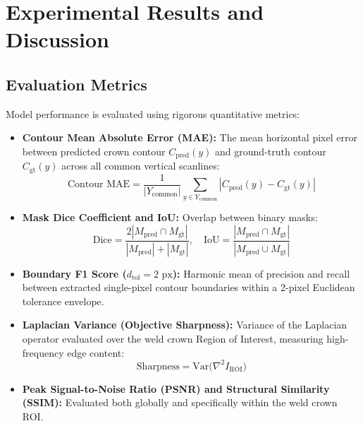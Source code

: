 \documentclass[12pt,a4paper,oneside]{report}
\begin{document}
\chapter{Experimental Results and Discussion}
\label{ch:results}

\section{Evaluation Metrics}
Model performance is evaluated using rigorous quantitative metrics:
\begin{itemize}
    \item \textbf{Contour Mean Absolute Error (MAE):} The mean horizontal pixel error between predicted crown contour $C_{\text{pred}}(y)$ and ground-truth contour $C_{\text{gt}}(y)$ across all common vertical scanlines:
    \begin{equation}
        \text{Contour MAE} = \frac{1}{|Y_{\text{common}}|} \sum_{y \in Y_{\text{common}}} |C_{\text{pred}}(y) - C_{\text{gt}}(y)|
    \end{equation}
    \item \textbf{Mask Dice Coefficient and IoU:} Overlap between binary masks:
    \begin{equation}
        \text{Dice} = \frac{2 |M_{\text{pred}} \cap M_{\text{gt}}|}{|M_{\text{pred}}| + |M_{\text{gt}}|}, \quad \text{IoU} = \frac{|M_{\text{pred}} \cap M_{\text{gt}}|}{|M_{\text{pred}} \cup M_{\text{gt}}|}
    \end{equation}
    \item \textbf{Boundary F1 Score ($d_{\text{tol}} = 2\text{ px}$):} Harmonic mean of precision and recall between extracted single-pixel contour boundaries within a 2-pixel Euclidean tolerance envelope.
    \item \textbf{Laplacian Variance (Objective Sharpness):} Variance of the Laplacian operator evaluated over the weld crown Region of Interest, measuring high-frequency edge content:
    \begin{equation}
        \text{Sharpness} = \text{Var}\big(\nabla^2 I_{\text{ROI}}\big)
    \end{equation}
    \item \textbf{Peak Signal-to-Noise Ratio (PSNR) and Structural Similarity (SSIM):} Evaluated both globally and specifically within the weld crown ROI.
\end{itemize}
\end{document}
